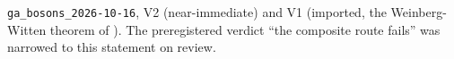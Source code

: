 \texttt{ga\_bosons\_2026-10-16}, V2 (near-immediate) and V1 (imported, the Weinberg-Witten theorem of ). The preregistered verdict ``the composite route fails'' was narrowed to this statement on review.
